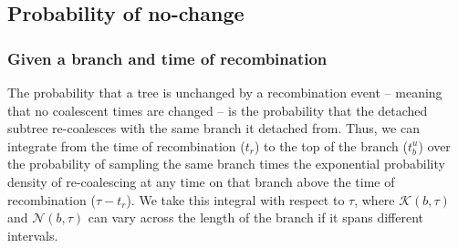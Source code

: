 \documentclass[11pt]{article}
\begin{document}
\subsection{Probability of no-change}
\subsubsection{Given a branch and time of recombination}

The probability that a tree is unchanged by a recombination event -- meaning that 
no coalescent times are changed -- is the probability that the detached subtree 
re-coalesces with the same branch it detached from. Thus, we can integrate 
from the time of recombination ($t_r$) to the top of the branch ($t_b^u$) over the 
probability of sampling the same branch times the exponential probability density
of re-coalescing at any time on that branch above the time of recombination 
($\tau - t_r$). We take this integral with respect to $\tau$, where 
$\mathcal{K}(b,\tau)$ and $\mathcal{N}(b,\tau)$
can vary across the length of the branch if it spans different intervals.




\end{document}
